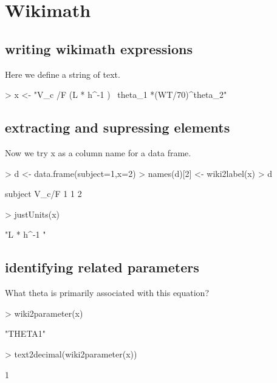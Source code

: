 \documentclass[titlepage]{article}
\begin{document}
\section*{Wikimath}
\subsection{writing wikimath expressions}
Here we define a string of text.
\begin{Schunk}
\begin{Sinput}
> x <- "V_c /F (L * h^-1 ) ~theta_1 *(WT/70)^theta_2"
\end{Sinput}
\end{Schunk}
\subsection{extracting and supressing elements}
Now we try x as a column name for a data frame.
\begin{Schunk}
\begin{Sinput}
> d <- data.frame(subject=1,x=2)
> names(d)[2] <- wiki2label(x)
> d
\end{Sinput}
\begin{Soutput}
  subject V_c/F
1       1     2
\end{Soutput}
\begin{Sinput}
> justUnits(x)
\end{Sinput}
\begin{Soutput}
[1] "L * h^-1 "
\end{Soutput}
\end{Schunk}
\subsection{identifying related parameters}
What theta is primarily associated with this equation?
\begin{Schunk}
\begin{Sinput}
> wiki2parameter(x)
\end{Sinput}
\begin{Soutput}
[1] "THETA1"
\end{Soutput}
\begin{Sinput}
> text2decimal(wiki2parameter(x))
\end{Sinput}
\begin{Soutput}
[1] 1
\end{Soutput}
\end{Schunk}
\end{document}
